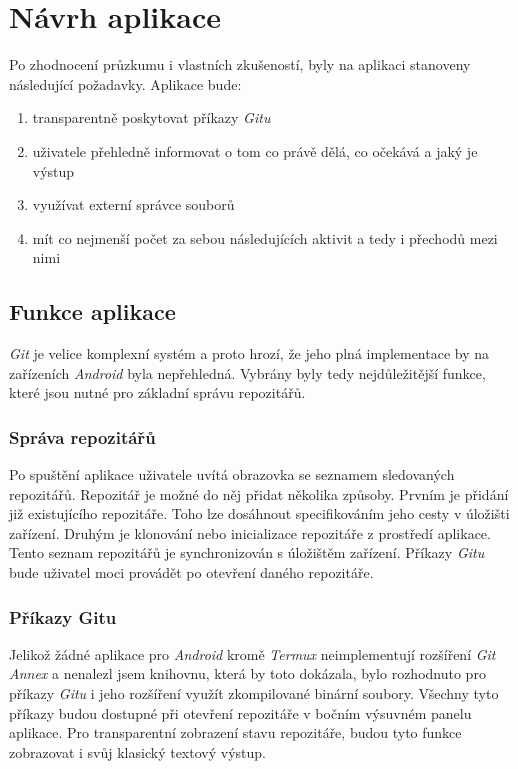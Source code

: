 \chapter{Návrh aplikace}
Po zhodnocení průzkumu i vlastních zkušeností, byly na aplikaci stanoveny následující požadavky. Aplikace bude:
\begin{enumerate}
    \item transparentně poskytovat příkazy \emph{Gitu}
    \item uživatele přehledně informovat o tom co právě dělá, co očekává a jaký je výstup
    \item využívat externí správce souborů
    \item mít co nejmenší počet za sebou následujících aktivit a tedy i přechodů mezi nimi
\end{enumerate}

\section{Funkce aplikace}
\emph{Git} je velice komplexní systém a proto hrozí, že jeho plná implementace by na zařízeních \emph{Android} byla nepřehledná. Vybrány byly tedy nejdůležitější funkce, které jsou nutné pro základní správu repozitářů.

    \subsection{Správa repozitářů}
    Po spuštění aplikace uživatele uvítá obrazovka se seznamem sledovaných repozitářů. Repozitář je možné do něj přidat několika způsoby. Prvním je přidání již existujícího repozitáře. Toho lze dosáhnout specifikováním jeho cesty v úložišti zařízení. Druhým je klonování nebo inicializace repozitáře z prostředí aplikace. Tento seznam repozitářů je synchronizován s úložištěm zařízení. Příkazy \emph{Gitu} bude uživatel moci provádět po otevření daného repozitáře.

    \newpage
    \subsection{Příkazy Gitu}
    Jelikož žádné aplikace pro \emph{Android} kromě \emph{Termux} neimplementují rozšíření \emph{Git Annex} a nenalezl jsem knihovnu, která by toto dokázala, bylo rozhodnuto pro příkazy \emph{Gitu} i jeho rozšíření využít zkompilované binární soubory. Všechny tyto příkazy budou dostupné při otevření repozitáře v bočním výsuvném panelu aplikace. Pro transparentní zobrazení stavu repozitáře, budou tyto funkce zobrazovat i svůj klasický textový výstup.


